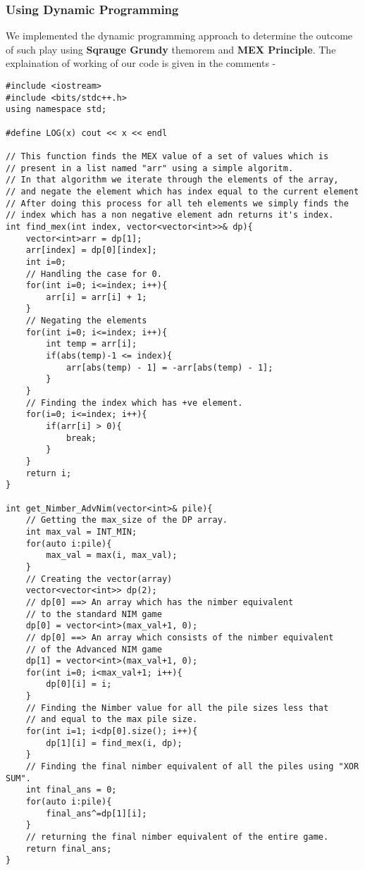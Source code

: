 \documentclass[11pt]{article}
\begin{document}
\subsubsection{Using Dynamic Programming}
We implemented the dynamic programming approach to determine the outcome of such play using \textbf{Sqrauge Grundy} themorem and \textbf{MEX Principle}. The explaination of working of our code is given in the comments -
\begin{verbatim}
#include <iostream>
#include <bits/stdc++.h>
using namespace std;

#define LOG(x) cout << x << endl

// This function finds the MEX value of a set of values which is
// present in a list named "arr" using a simple algoritm.
// In that algorithm we iterate through the elements of the array, 
// and negate the element which has index equal to the current element
// After doing this process for all teh elements we simply finds the 
// index which has a non negative element adn returns it's index.
int find_mex(int index, vector<vector<int>>& dp){
    vector<int>arr = dp[1];
    arr[index] = dp[0][index];
    int i=0;
    // Handling the case for 0.
    for(int i=0; i<=index; i++){
        arr[i] = arr[i] + 1;
    }
    // Negating the elements
    for(int i=0; i<=index; i++){
        int temp = arr[i];
        if(abs(temp)-1 <= index){
            arr[abs(temp) - 1] = -arr[abs(temp) - 1];
        }
    }
    // Finding the index which has +ve element.
    for(i=0; i<=index; i++){
        if(arr[i] > 0){
            break;
        }
    }
    return i;
}

int get_Nimber_AdvNim(vector<int>& pile){
    // Getting the max_size of the DP array.
    int max_val = INT_MIN;
    for(auto i:pile){
        max_val = max(i, max_val);
    }
    // Creating the vector(array)
    vector<vector<int>> dp(2);
    // dp[0] ==> An array which has the nimber equivalent
    // to the standard NIM game
    dp[0] = vector<int>(max_val+1, 0);
    // dp[0] ==> An array which consists of the nimber equivalent
    // of the Advanced NIM game
    dp[1] = vector<int>(max_val+1, 0);
    for(int i=0; i<max_val+1; i++){
        dp[0][i] = i;
    }
    // Finding the Nimber value for all the pile sizes less that
    // and equal to the max pile size.
    for(int i=1; i<dp[0].size(); i++){
        dp[1][i] = find_mex(i, dp);
    }
    // Finding the final nimber equivalent of all the piles using "XOR SUM".
    int final_ans = 0;
    for(auto i:pile){
        final_ans^=dp[1][i];
    }
    // returning the final nimber equivalent of the entire game.
    return final_ans;
}


\end{verbatim}
\end{document}
